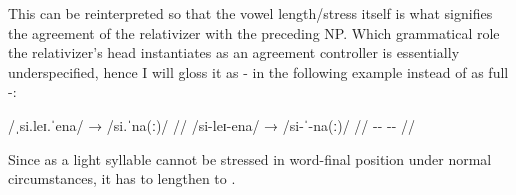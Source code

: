 This can be reinterpreted so that the vowel length/stress itself is what 
signifies the agreement of the relativizer with the preceding NP. Which 
grammatical role the relativizer's head instantiates as an agreement controller
is essentially underspecified, hence I will gloss it as -\Agr{} in the 
following example instead of as full -\PargI{}:

\ex[everygla=\upshape]\begingl
	\gla /ˌsi.leɪ.ˈena/ → /si.ˈna(ː)/ //
	\glb /si-leɪ-ena/ → /si-ˈ-na(ː)/ //
	\glc \Rel{}-\PargI{}-\Gen{} {} \Rel{}-\Agr{}-\Gen{} //
\endgl\xe

Since  as a light syllable cannot be stressed in word-final 
position under normal circumstances, it has to lengthen to .


% 
% 
% 
